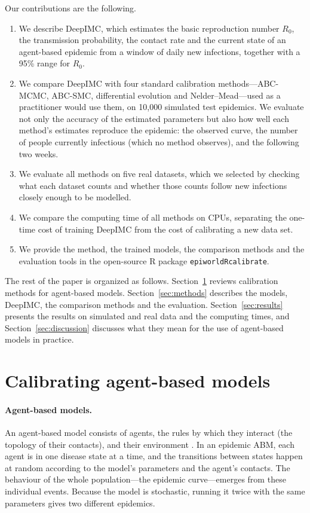 \documentclass[12pt]{article}
\begin{document}
Our contributions are the following.
\begin{enumerate}[leftmargin=*]
\item We describe DeepIMC, which estimates the basic reproduction number $R_0$, the transmission
probability, the contact rate and the current state of an agent-based epidemic from a window of
daily new infections, together with a 95\% range for $R_0$.
\item We compare DeepIMC with four standard calibration methods---ABC-MCMC, ABC-SMC, differential
evolution and Nelder--Mead---used as a practitioner would use them, on 10,000 simulated test
epidemics. We evaluate not only the accuracy of the estimated parameters but also how well each
method's estimates reproduce the epidemic: the observed curve, the number of people currently
infectious (which no method observes), and the following two weeks.
\item We evaluate all methods on five real datasets, which we selected by checking what each
dataset counts and whether those counts follow new infections closely enough to be modelled.
\item We compare the computing time of all methods on CPUs, separating the one-time cost of
training DeepIMC from the cost of calibrating a new data set.
\item We provide the method, the trained models, the comparison methods and the evaluation tools in
the open-source R package \texttt{epiworldRcalibrate}.
\end{enumerate}

The rest of the paper is organized as follows. Section~\ref{sec:background} reviews calibration
methods for agent-based models. Section~\ref{sec:methods} describes the models, DeepIMC, the
comparison methods and the evaluation. Section~\ref{sec:results} presents the results on simulated
and real data and the computing times, and Section~\ref{sec:discussion} discusses what they mean
for the use of agent-based models in practice.

\section{Calibrating agent-based models}\label{sec:background}

\paragraph{Agent-based models.} An agent-based model consists of agents, the rules by which they
interact (the topology of their contacts), and their environment
\autocite{railsbackAgentbasedIndividualbasedModeling2019}. In an epidemic ABM, each agent is in one
disease state at a time, and the transitions between states happen at random according to the
model's parameters and the agent's contacts. The behaviour of the whole population---the epidemic
curve---emerges from these individual events. Because the model is stochastic, running it twice
with the same parameters gives two different epidemics.
\end{document}
